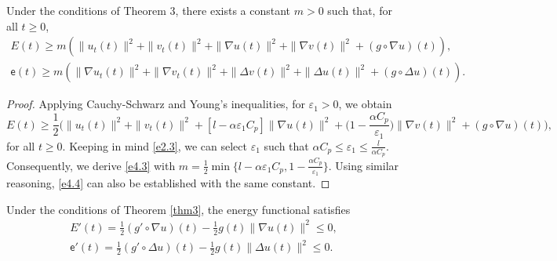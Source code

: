 \documentclass[reqno]{amsart}
\begin{document}
\begin{lemma} \label{lem4}
Under the conditions of Theorem 3, there exists a constant $m > 0$
such that, for all $ t \geq 0$,
\begin{gather}
E(t) \geq m \left( \| u_t(t) \|^2 + \| v_t(t) \|^2 + \| \nabla u(t) \|^2
+ \| \nabla v(t) \|^2 + (g \circ \nabla u)(t)\right), \label{e4.3} \\
\mathsf{e}(t) \geq m \left( \| \nabla u_t(t) \|^2+\| \nabla v_t(t) \|^2
+ \| \Delta v(t) \|^2 + \| \Delta u(t) \|^2
+ (g \circ \Delta u)(t)\right) .\label{e4.4}
\end{gather}
\end{lemma}

\begin{proof}
Applying Cauchy-Schwarz and Young's inequalities, for
$ \varepsilon_{1} > 0$, we obtain
\[
E(t) \geq \frac{1}{2} \Big( \| u_t(t) \|^2
 + \| v_t(t) \|^2 + \left[ l -\alpha \varepsilon_{1} C_p \right] \| \nabla u(t) \|^2
 + \big( 1-\frac{\alpha C_p}{\varepsilon_{1}}\big) \| \nabla v(t) \|^2
 + (g \circ \nabla u)(t)\Big),
 \]
 for all $t\geq 0$.
Keeping in mind \eqref{e2.3}, we can select $\varepsilon_{1}$ such that
 $\alpha C_p \leq \varepsilon_{1}\leq \frac{l}{\alpha C_p}$.
Consequently, we derive \eqref{e4.3} with
$ m = \frac{1}{2} \min \{ l -\alpha \varepsilon_{1} C_p,
1-\frac{\alpha C_p }{\varepsilon_{1}} \} $.
Using similar reasoning, \eqref{e4.4} can also be established with the same constant.
\end{proof}

\begin{lemma} \label{lem5}
Under the conditions of Theorem \ref{thm3}, the energy functional satisfies
\begin{gather}
E'(t) = \frac{1}{2} (g' \circ \nabla u)(t) - \frac{1}{2} g(t) \| \nabla u(t) \|^2
 \leq 0, \label{e4.5}\\
\mathsf{e}'(t)= \frac{1}{2}(g' \circ \Delta u)(t)-\frac{1}{2} g(t) \| \Delta u(t) \|^2
\leq 0.\label{e4.6}
\end{gather}
\end{lemma}
\end{document}
